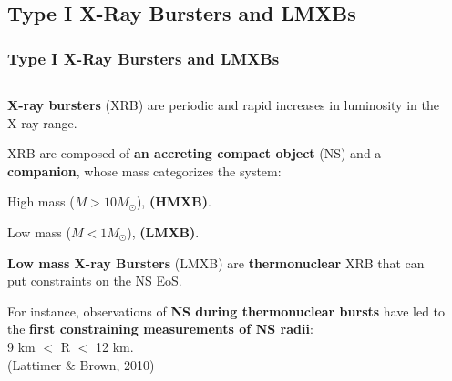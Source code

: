 \subsection*{Type I X-Ray Bursters and LMXBs  }
\begin{frame}
\frametitle{Type I X-Ray Bursters and LMXBs}

\begin{columns}[c]
\begin{column}{0.6\textwidth} 
\begin{enumerate}\scriptsize{
\item {\bf X-ray bursters} (XRB) are periodic and rapid increases in luminosity in the X-ray range.

\quad


\item XRB are composed of {\bf an accreting compact object} (NS) and a {\bf companion}, whose mass categorizes the system:
\begin{itemize}\scriptsize{
 \item High mass ($M > 10 M_{\odot}$), {\bf (HMXB)}.
 \item Low mass ($M < 1 M_{\odot}$), {\bf (LMXB)}.}
\end{itemize}

\quad

\item {\bf Low mass X-ray Bursters} (LMXB) are {\bf thermonuclear} XRB that can put constraints on the NS EoS.

\quad

 
 \item For instance, observations of {\bf NS during thermonuclear bursts} have led to the {\bf  first constraining measurements of NS radii}: \\9 km $<$ R $<$ 12 km. \\{\tiny (Lattimer $\&$ Brown, 2010)}


}
\end{enumerate}
\end{column}
\begin{column}{0.55\textwidth}

\end{column}
\end{columns}
\end{frame}
